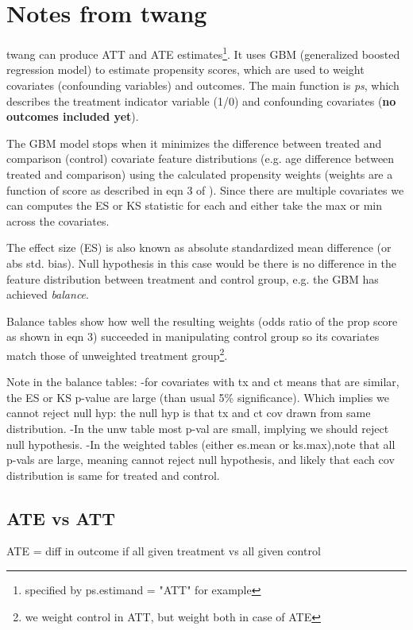 \documentclass[11pt]{scrartcl}
\begin{document}
\section{Notes from twang}
twang can produce ATT and ATE estimates\footnote{specified by ps.estimand = "ATT" for example}.  It uses GBM (generalized boosted regression model) to estimate propensity scores, which are used to weight covariates (confounding variables) and outcomes.  The main function is \emph{ps}, which describes the treatment indicator variable (1/0) and confounding covariates (\textbf{no outcomes included yet}).  

The GBM model stops when it minimizes the difference between treated and comparison (control) covariate feature distributions (e.g. age difference between treated and comparison) using the calculated propensity weights (weights are a function of score as described in eqn 3 of \cite{ridgeway2015toolkit}).  Since there are multiple covariates we can computes the ES or KS statistic for each and either take the max or min across the covariates.  

The effect size (ES) is also known as absolute standardized mean difference (or abs std. bias).  Null hypothesis in this case would be there is no difference in the feature distribution between treatment and control group, e.g. the GBM has achieved \emph{balance}.  

Balance tables show how well the resulting weights (odds ratio of the prop score as shown in eqn 3) succeeded in manipulating control group so its covariates match those of unweighted treatment group\footnote{we weight control in ATT, but weight both in case of ATE}.  

Note in the balance tables:
-for covariates with tx and ct means that are similar, the ES or KS p-value are large (than usual 5\% significance).  Which implies we cannot reject null hyp: the null hyp is that tx and ct cov drawn from same distribution.  
-In the unw table most p-val are small, implying we should reject null hypothesis.
-In the weighted tables (either es.mean or ks.max),note that all p-vals are large, meaning cannot reject null hypothesis, and likely that each cov distribution is same for treated and control.


\subsection{ATE vs ATT}
ATE = diff in outcome if all given treatment vs all given control 
\end{document}
